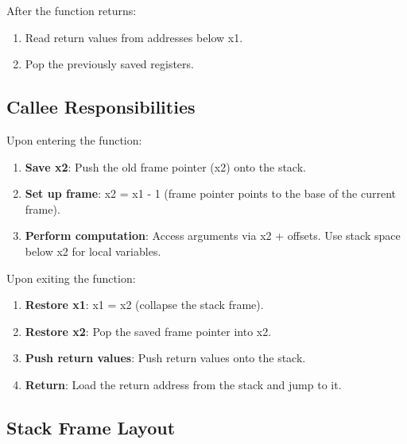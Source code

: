 \documentclass[12pt,a4paper]{article}
\begin{document}
After the function returns:
\begin{enumerate}
    \item Read return values from addresses below x1.
    \item Pop the previously saved registers.
\end{enumerate}

\subsection{Callee Responsibilities}

Upon entering the function:
\begin{enumerate}
    \item \textbf{Save x2}: Push the old frame pointer (x2) onto the stack.
    \item \textbf{Set up frame}: x2 = x1 - 1 (frame pointer points to the base of the current frame).
    \item \textbf{Perform computation}: Access arguments via x2 + offsets. Use stack space below x2 for local variables.
\end{enumerate}

Upon exiting the function:
\begin{enumerate}
    \item \textbf{Restore x1}: x1 = x2 (collapse the stack frame).
    \item \textbf{Restore x2}: Pop the saved frame pointer into x2.
    \item \textbf{Push return values}: Push return values onto the stack.
    \item \textbf{Return}: Load the return address from the stack and jump to it.
\end{enumerate}

\subsection{Stack Frame Layout}
\end{document}
